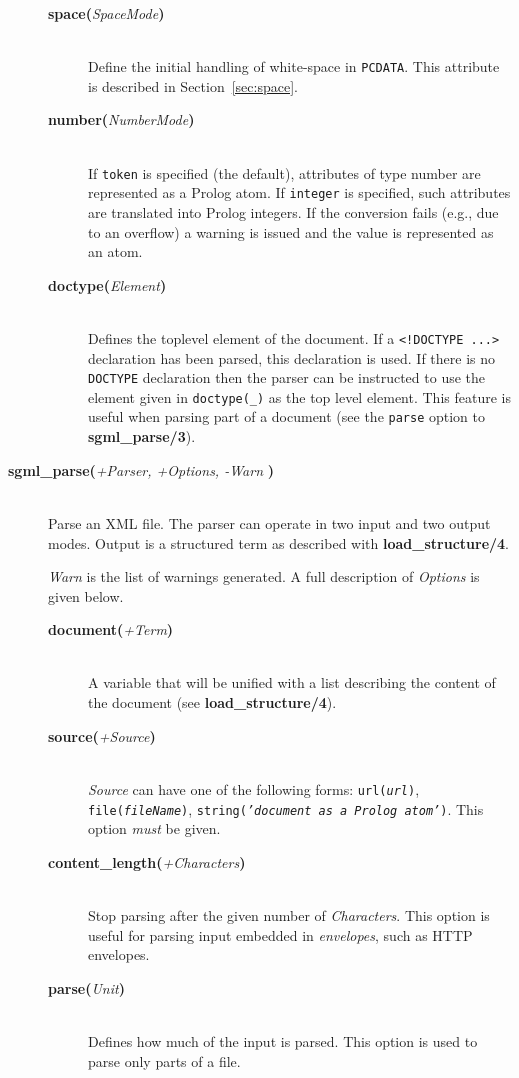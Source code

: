 \begin{description}
\begin{description}
  \item[{\bf space}{\bf (}{\it SpaceMode}{\bf )}]\mbox{}\\
    Define the initial handling of white-space in {\tt PCDATA}.  This attribute is
    described in Section~\ref{sec:space}.
  \item[{\bf number}{\bf (}{\it NumberMode}{\bf )}]\mbox{}\\
    If {\tt token} is specified (the default), attributes of type number are represented as a Prolog atom.
    If {\tt integer} is specified, such attributes are translated into Prolog integers.  If
    the conversion fails (e.g., due to an overflow) a warning is issued and the
    value is represented as an atom.
  \item[{\bf doctype}{\bf (}{\it Element}{\bf )}]\mbox{}\\
    Defines the toplevel element of the document. If a \verb$<!DOCTYPE ...>$
    declaration has been parsed, this declaration is used. If there is no
    {\tt DOCTYPE} declaration then the 
    parser can be instructed to use the element given in
    {\tt doctype(\_)} as the top level element. This feature is
    useful when parsing part of a document (see the {\tt parse} option to
    {\bf sgml\_parse/3}).
  \end{description}
  
\item[{\bf sgml\_parse}{\bf (}{\it +Parser, +Options, -Warn}{\bf
    )}]\mbox{}\\Parse an XML file.  The parser can operate in two input and
  two output modes. Output is a structured term as described with {\bf
    load\_structure/4}.
  
  {\it Warn} is the list of warnings generated. A full description of
  \emph{Options} is given below.

  \begin{description}
  \item[{\bf document}{\bf (}{\it +Term}{\bf )}]\mbox{}\\
    A variable that will be unified with a list describing the content of 
    the document (see {\bf load\_structure/4}). 
  \item[{\bf source}{\bf (}{\it +Source}{\bf )}]\mbox{}\\
    {\it Source} can have one of the following forms:
   {\tt url({\it url})}, {\tt file({\it fileName})},
  {\tt string({\it 'document as a Prolog atom'})}.
  This option \emph{must} be given.
  \item[{\bf content\_length}{\bf (}{\it +Characters}{\bf )}]\mbox{}\\
    Stop parsing after the given number of
    {\it Characters}.  This option is useful for parsing
    input embedded in \emph{envelopes}, such as HTTP envelopes.
  \item[{\bf parse}{\bf (}{\it Unit}{\bf )}]\mbox{}\\
    Defines how much of the input is parsed.  This option is used to parse
    only parts of a file.
    


\end{description}
\end{description}
